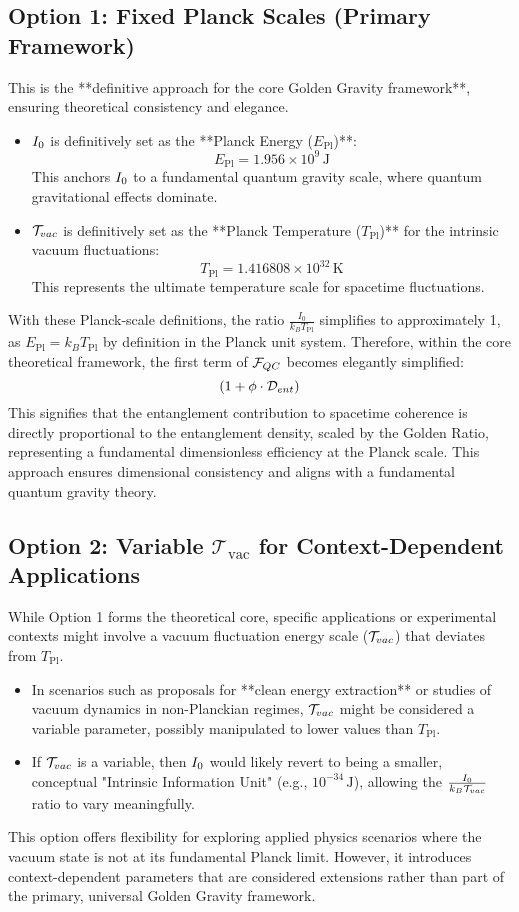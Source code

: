 \subsection*{Option 1: Fixed Planck Scales (Primary Framework)}
This is the **definitive approach for the core Golden Gravity framework**, ensuring theoretical consistency and elegance.
\begin{itemize}[noitemsep]
    \item $I_0$ is definitively set as the **Planck Energy ($E_{\text{Pl}}$)**:
    \[E_{\text{Pl}} = 1.956 \times 10^9 \, \text{J}\]
    This anchors $I_0$ to a fundamental quantum gravity scale, where quantum gravitational effects dominate.
    \item $\mathcal{T}_{vac}$ is definitively set as the **Planck Temperature ($T_{\text{Pl}}$)** for the intrinsic vacuum fluctuations:
    \[T_{\text{Pl}} = 1.416808 \times 10^{32} \, \text{K}\]
    This represents the ultimate temperature scale for spacetime fluctuations.
\end{itemize}
With these Planck-scale definitions, the ratio $\frac{I_0}{k_B T_{\text{Pl}}}$ simplifies to approximately 1, as $E_{\text{Pl}} = k_B T_{\text{Pl}}$ by definition in the Planck unit system.
Therefore, within the core theoretical framework, the first term of $\mathcal{F}_{QC}$ becomes elegantly simplified:
\[ \left( 1 + \phi \cdot \mathcal{D}_{ent} \right) \]
This signifies that the entanglement contribution to spacetime coherence is directly proportional to the entanglement density, scaled by the Golden Ratio, representing a fundamental dimensionless efficiency at the Planck scale. This approach ensures dimensional consistency and aligns with a fundamental quantum gravity theory.

\subsection*{Option 2: Variable $\mathcal{T}_{\text{vac}}$ for Context-Dependent Applications}
While Option 1 forms the theoretical core, specific applications or experimental contexts might involve a vacuum fluctuation energy scale ($\mathcal{T}_{vac}$) that deviates from $T_{\text{Pl}}$.
\begin{itemize}[noitemsep]
    \item In scenarios such as proposals for **clean energy extraction** or studies of vacuum dynamics in non-Planckian regimes, $\mathcal{T}_{vac}$ might be considered a variable parameter, possibly manipulated to lower values than $T_{\text{Pl}}$.
    \item If $\mathcal{T}_{vac}$ is a variable, then $I_0$ would likely revert to being a smaller, conceptual "Intrinsic Information Unit" (e.g., $10^{-34} \, \text{J}$), allowing the $\frac{I_0}{k_B \mathcal{T}_{vac}}$ ratio to vary meaningfully.
\end{itemize}
This option offers flexibility for exploring applied physics scenarios where the vacuum state is not at its fundamental Planck limit. However, it introduces context-dependent parameters that are considered extensions rather than part of the primary, universal Golden Gravity framework.

